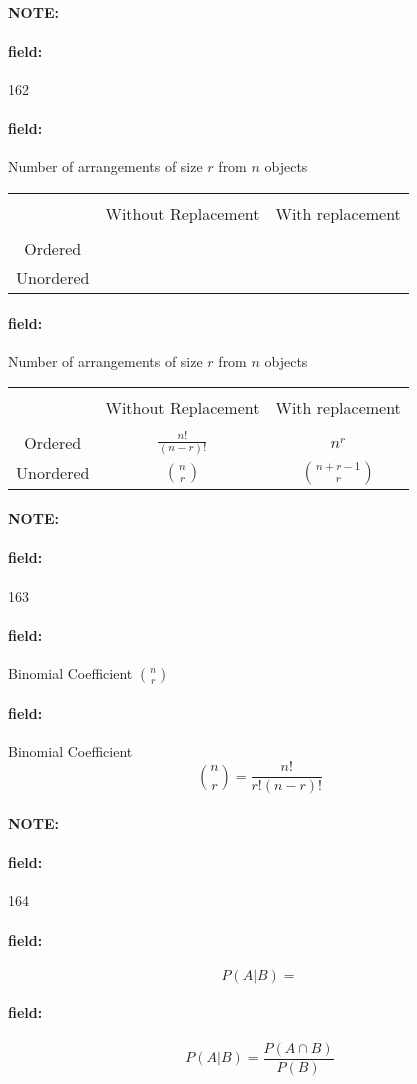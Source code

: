 \documentclass[12pt]{article}
\newenvironment{note}{\paragraph{NOTE:}}{}
\newenvironment{field}{\paragraph{field:}}{}
\begin{document}
\begin{note} \begin{field} \tiny 162 \end{field}
  \begin{field}
    Number of arrangements of size $r$ from $n$ objects

    \begin{tabular}{|c| c c|}
      \hline \\
       & Without Replacement & With replacement\\
       \hline \\
       Ordered & & \\
       Unordered & & \\
       \hline
    \end{tabular}
  \end{field}
  \begin{field}
    Number of arrangements of size $r$ from $n$ objects

    \begin{tabular}{|c| c c|}
      \hline \\
       & Without Replacement & With replacement\\
       \hline \\
       Ordered & $\frac{n!}{(n-r)!}$ & $n^r$ \\
       Unordered & $\binom{n}{r}$& $\binom{n+r-1}{r}$ \\
       \hline
    \end{tabular}
  \end{field}
\end{note}



\begin{note} \begin{field} \tiny 163 \end{field}
    \begin{field}
        Binomial Coefficient $\binom{n}{r}$
    \end{field}
    \begin{field}
      Binomial Coefficient
        $$\binom{n}{r} = \frac{n!}{r!(n-r)!}$$
    \end{field}
\end{note}

\begin{note} \begin{field} \tiny 164 \end{field}
  \begin{field}
    $$P(A|B)=$$
  \end{field}
  \begin{field}
    $$ P(A|B) = \frac{P(A \cap B)}{P(B)} $$
  \end{field}
\end{note}
\end{document}
